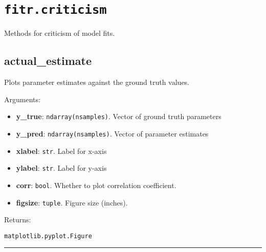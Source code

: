 \hypertarget{fitr.criticism}{%
\section{\texorpdfstring{\texttt{fitr.criticism}}{fitr.criticism}}\label{fitr.criticism}}

Methods for criticism of model fits.

\hypertarget{actual_estimate}{%
\subsection{actual\_estimate}\label{actual_estimate}}

\begin{Shaded}
\begin{Highlighting}[]
\OperatorTok{=}\OperatorTok{=}\OperatorTok{=}\OperatorTok{=}\NormalTok{)}
\end{Highlighting}
\end{Shaded}

Plots parameter estimates against the ground truth values.

Arguments:

\begin{itemize}
\tightlist
\item
  \textbf{y\_true}: \texttt{ndarray(nsamples)}. Vector of ground truth
  parameters
\item
  \textbf{y\_pred}: \texttt{ndarray(nsamples)}. Vector of parameter
  estimates
\item
  \textbf{xlabel}: \texttt{str}. Label for x-axis
\item
  \textbf{ylabel}: \texttt{str}. Label for y-axis
\item
  \textbf{corr}: \texttt{bool}. Whether to plot correlation coefficient.
\item
  \textbf{figsize}: \texttt{tuple}. Figure size (inches).
\end{itemize}

Returns:

\texttt{matplotlib.pyplot.Figure}

\begin{center}\rule{0.5\linewidth}{\linethickness}\end{center}
